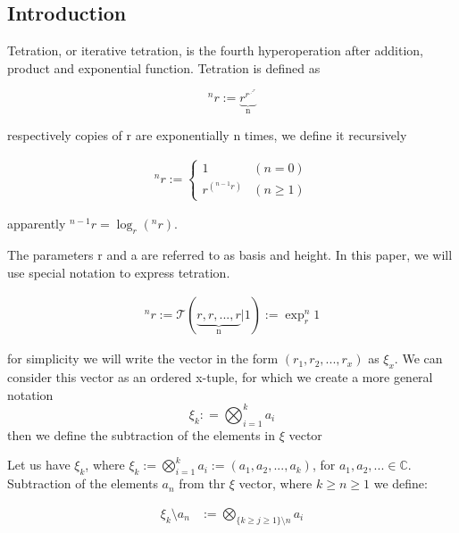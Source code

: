 \section{}

\subsection{Introduction}

Tetration, or iterative tetration, is the fourth hyperoperation \cite{24} 
after addition, product and exponential function. Tetration is defined as

\[^nr := \underbrace{r^{r^{\iddots^{r}}}}_{\text{n}} \]

respectively copies of r are exponentially n times, we define it recursively

\begin{align}
        ^n r :=\left\{ 
        \begin{array}{ll}
                1 & (n = 0) \\
                r^{\left( ^{n-1}r \right)} & (n \geq 1)
        \end{array} \right.
\end{align}

apparently \(^{n-1}r = \log_r(^n r)\). 

The parameters r and a are referred to as basis and height. In this paper,
we will use special notation to express tetration.

\begin{align}
^n r:= \mathcal{T}(\underbrace{r, r, ..., r}_{\text{n}} | 1) := \exp_r^n 1
\end{align}

for simplicity we will write the vector in the form \((r_1, r_2, ..., r_x)\) 
as \(\xi_x\). We can consider this vector as an ordered x-tuple, for which we
create a more general notation \cite{28} \[\xi_k: = \bigotimes_{i=1}^k a_i \]
then we define the subtraction of the elements in \(\xi\) vector

\begin{definition}
        Let us have \(\xi_k\), where \(\xi_k :=\bigotimes_{i=1}^k a_i := (a_1, a_2,
        ..., a_k)\), for \(a_1, a_2, ... \in \mathbb{C}\). Subtraction of the elements 
        \(a_n\) from thr \(\xi\) vector, where \(k \geq n \geq 1\) we define:
        
        \begin{align}
                \xi_k \setminus a_n &:= \bigotimes_{\{k \geq j \geq 1\} \setminus n} a_i
        \end{align}
\end{definition}

